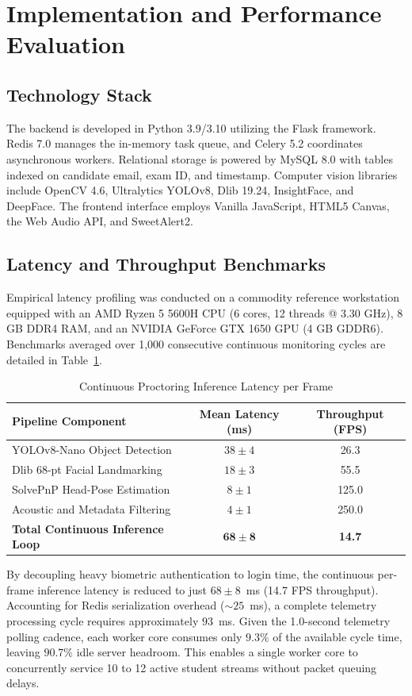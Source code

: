 \documentclass[conference]{IEEEtran}
\begin{document}
\section{Implementation and Performance Evaluation}

\subsection{Technology Stack}
The backend is developed in Python 3.9/3.10 utilizing the Flask framework. Redis 7.0 manages the in-memory task queue, and Celery 5.2 coordinates asynchronous workers. Relational storage is powered by MySQL 8.0 with tables indexed on candidate email, exam ID, and timestamp. Computer vision libraries include OpenCV 4.6, Ultralytics YOLOv8, Dlib 19.24, InsightFace, and DeepFace. The frontend interface employs Vanilla JavaScript, HTML5 Canvas, the Web Audio API, and SweetAlert2.

\subsection{Latency and Throughput Benchmarks}
Empirical latency profiling was conducted on a commodity reference workstation equipped with an AMD Ryzen 5 5600H CPU (6 cores, 12 threads @ 3.30 GHz), 8 GB DDR4 RAM, and an NVIDIA GeForce GTX 1650 GPU (4 GB GDDR6). Benchmarks averaged over 1,000 consecutive continuous monitoring cycles are detailed in Table~\ref{tab:latency}.

\begin{table}[h]
\centering
\caption{Continuous Proctoring Inference Latency per Frame}
\label{tab:latency}
\begin{tabular}{lcc}
\toprule
\textbf{Pipeline Component} & \textbf{Mean Latency (ms)} & \textbf{Throughput (FPS)} \\
\midrule
YOLOv8-Nano Object Detection & $38 \pm 4$ & 26.3 \\
Dlib 68-pt Facial Landmarking & $18 \pm 3$ & 55.5 \\
SolvePnP Head-Pose Estimation & $8 \pm 1$ & 125.0 \\
Acoustic and Metadata Filtering & $4 \pm 1$ & 250.0 \\
\midrule
\textbf{Total Continuous Inference Loop} & $\mathbf{68 \pm 8}$ & \textbf{14.7} \\
\bottomrule
\end{tabular}
\end{table}

By decoupling heavy biometric authentication to login time, the continuous per-frame inference latency is reduced to just $68 \pm 8$~ms (14.7 FPS throughput). Accounting for Redis serialization overhead ($\sim 25$~ms), a complete telemetry processing cycle requires approximately $93$~ms. Given the 1.0-second telemetry polling cadence, each worker core consumes only $9.3\%$ of the available cycle time, leaving $\mathbf{90.7\%}$ idle server headroom. This enables a single worker core to concurrently service 10 to 12 active student streams without packet queuing delays.
\end{document}
